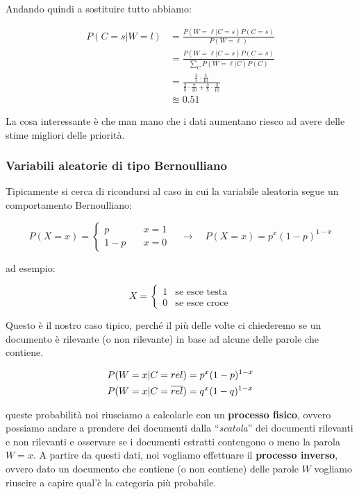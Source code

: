 Andando quindi a sostituire tutto abbiamo:

\begin{align*}
	P(C = s | W = l) &= \frac{P(W = \ell | C = s)P(C=s)}{P(W = \ell)} \\
	                 &= \frac{P(W = \ell | C = s)P(C=s)}{\sum\limits_{C} P(W = \ell | C)P(C)} \\
	                 &= \frac{\frac{3}{5}\cdot\frac{3}{10}}{ \frac{2}{8}\cdot\frac{7}{10} + \frac{3}{5}\cdot\frac{3}{10} } \\
					 &\approxeq 0.51
\end{align*}

\noindent La cosa interessante è che man mano che i dati aumentano riesco ad avere delle stime migliori delle priorità.

\subsubsection{Variabili aleatorie di tipo Bernoulliano}

Tipicamente si cerca di ricondursi al caso in cui la variabile aleatoria segue un comportamento Bernoulliano:

$$
P(X = x) = \begin{cases}
p \quad& x= 1 \\
1-p \quad& x=0
\end{cases} \quad \rightarrow \quad P(X = x)=  p^x(1-p)^{1-x}
$$

\noindent ad esempio:

$$
X = \begin{cases}
1 &\text{se esce testa} \\
0 &\text{se esce croce}
\end{cases}
$$

Questo è il nostro caso tipico, perché il più delle volte ci chiederemo se un documento è rilevante (o non rilevante) in base ad alcune delle parole che contiene.

\begin{align*}
	P(W = x | C = rel) &= p^x(1-p)^{1-x}\\
	P(W = x | C = \overline{rel}) &= q^x(1-q)^{1-x}
\end{align*}

\noindent queste probabilità noi riusciamo a calcolarle con un \textbf{processo fisico}, ovvero possiamo andare a prendere dei documenti dalla ``\textit{scatola}'' dei documenti rilevanti e non rilevanti e osservare se i documenti estratti contengono o meno la parola $W = x$.
A partire da questi dati, noi vogliamo effettuare il \textbf{processo inverso}, ovvero dato un documento che contiene (o non contiene) delle parole $W$ vogliamo riuscire a capire qual'è la categoria più probabile.

